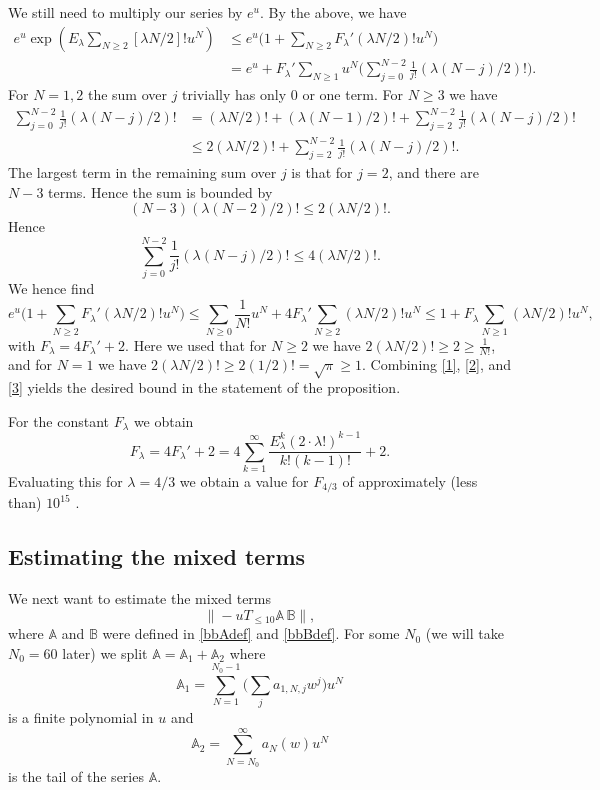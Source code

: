 \documentclass[12pt]{amsart}
\theoremstyle{definition}
\numberwithin{equation}{section}
\newcommand{\numcheck}[1]{\cite[Computation #1]{SupplementaryNotebook}}
\theoremstyle{definition} %
\theoremstyle{remark}
\begin{document}
We still need to multiply our series by $e^u$. By the above, we have
\begin{align} 
e^u \exp(E_\lambda \sum_{N\geq 2}[\lambda N/2]! u^N) &\leq
e^u \Big(1+\sum_{N\geq 2} F_\lambda' (\lambda N/2)! u^N\Big) \label{2} \\
&=
e^u
+
F_\lambda' \sum_{N\geq 1}  u^N \Big(\sum_{j=0}^{N-2}\frac{1}{j!}(\lambda (N-j)/2)!\Big) \label{l2}
.
\end{align}
For $N=1,2$ the sum over $j$ trivially has only 0 or one term.
For $N\geq 3$ we have 
\begin{align*}
    \sum_{j=0}^{N-2}\frac{1}{j!}(\lambda (N-j)/2)!
    &=
    (\lambda N/2)!
    + (\lambda (N-1)/2)!
    +
    \sum_{j=2}^{N-2}\frac{1}{j!}(\lambda (N-j)/2)! \\
    &\leq 2(\lambda N/2)!+ \sum_{j=2}^{N-2}\frac{1}{j!}(\lambda (N-j)/2)!.
\end{align*}
The largest term in the remaining sum over $j$ is that for $j=2$, and there are $N-3$ terms. Hence the sum is bounded by 
\[
(N-3) (\lambda (N-2)/2)! \leq 2 (\lambda N/2)!.
\]
Hence 
\[
    \sum_{j=0}^{N-2}\frac{1}{j!}(\lambda (N-j)/2)!
    \leq 4 (\lambda N/2)!.
\]
We hence find 
\begin{equation}
 \label{3}    e^u \Big(1+\sum_{N\geq 2} F_\lambda' (\lambda N/2)! u^N\Big)
    \leq 
\sum_{N\geq 0} \frac{1}{N!} u^N
+
4F_\lambda'
\sum_{N\geq 2}(\lambda N/2)! u^N
    \leq 
    1+ F_\lambda \sum_{N\geq 1}(\lambda N/2)! u^N,
\end{equation}
with $F_\lambda=4F_\lambda'+2$. 
Here we used that for $N\geq 2$ we have $2(\lambda N/2)!\geq 2\geq \frac1{N!}$, and for $N=1$ we have $2(\lambda N/2)!\geq 2(1/2)!=\sqrt{\pi} \geq 1$. Combining \eqref{1}, \eqref{2}, and \eqref{3} yields the desired bound in the statement of the proposition.

For the constant $F_\lambda$ we obtain
\[
F_{\lambda } = 4F_{\lambda}' +2 =
4\sum_{k=1}^\infty \frac {E_\lambda^k (2\cdot \lambda!)^{k-1}}{k!(k-1)!}
+2.
\]
Evaluating this for $\lambda=4/3$ we obtain a value for $F_{4/3}$ of approximately (less than) $10^{15}$ \numcheck{FLAMBDA}. 


\newcommand{\bbA}{\mathbb{A}}
\newcommand{\bbB}{\mathbb{B}}
\subsection{Estimating the mixed terms}\label{sec:mixed estimates}

We next want to estimate the mixed terms 
\[
\|-uT_{\leq 10}\bbA\,  \bbB \|,
\]
where $\bbA$ and $\bbB$ were defined in \eqref{bbAdef}  and \eqref{bbBdef}. For some $N_0$ (we will take $N_0=60$ later) we split 
$\bbA = \bbA_1 + \bbA_2$
where 
\[
    \bbA_1 = \sum_{N=1}^{N_0-1} \Big(\sum_j a_{1,N,j} w^j\Big) u^N
\]
is a finite polynomial in $u$ and 
\[
    \bbA_2 = \sum_{N=N_0}^{\infty} a_N(w) u^N
\]
is the tail of the series $\bbA$.
\end{document}
